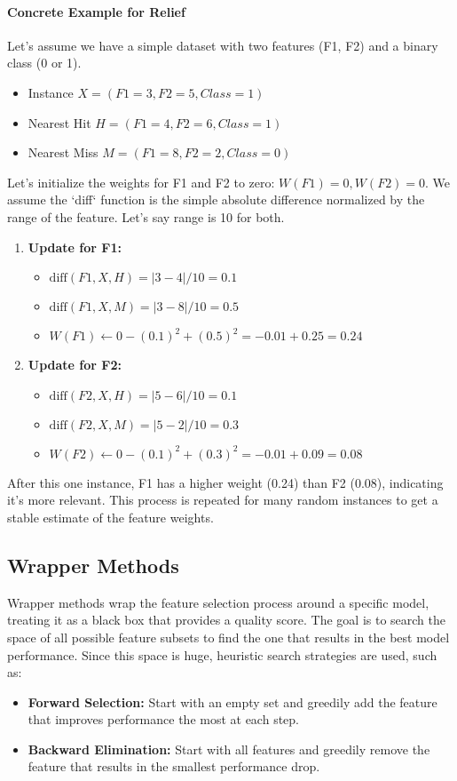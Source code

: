 \documentclass{article}
\begin{document}
\begin{multicols}{2}
	\paragraph{Concrete Example for Relief}
	Let's assume we have a simple dataset with two features (F1, F2) and a binary class (0 or 1).
	\begin{itemize}
		\item Instance $X = (F1=3, F2=5, Class=1)$
		\item Nearest Hit $H = (F1=4, F2=6, Class=1)$
		\item Nearest Miss $M = (F1=8, F2=2, Class=0)$
	\end{itemize}
	Let's initialize the weights for F1 and F2 to zero: $W(F1)=0, W(F2)=0$. We assume the `diff` function is the simple absolute difference normalized by the range of the feature. Let's say range is 10 for both.
	\begin{enumerate}
		\item \textbf{Update for F1:}
		      \begin{itemize}
			      \item $\text{diff}(F1, X, H) = |3 - 4| / 10 = 0.1$
			      \item $\text{diff}(F1, X, M) = |3 - 8| / 10 = 0.5$
			      \item $W(F1) \leftarrow 0 - (0.1)^2 + (0.5)^2 = -0.01 + 0.25 = 0.24$
		      \end{itemize}
		\item \textbf{Update for F2:}
		      \begin{itemize}
			      \item $\text{diff}(F2, X, H) = |5 - 6| / 10 = 0.1$
			      \item $\text{diff}(F2, X, M) = |5 - 2| / 10 = 0.3$
			      \item $W(F2) \leftarrow 0 - (0.1)^2 + (0.3)^2 = -0.01 + 0.09 = 0.08$
		      \end{itemize}
	\end{enumerate}
	After this one instance, F1 has a higher weight (0.24) than F2 (0.08), indicating it's more relevant. This process is repeated for many random instances to get a stable estimate of the feature weights.

	\subsection{Wrapper Methods}
	Wrapper methods wrap the feature selection process around a specific model, treating it as a black box that provides a quality score. The goal is to search the space of all possible feature subsets to find the one that results in the best model performance. Since this space is huge, heuristic search strategies are used, such as:
	\begin{itemize}
		\item \textbf{Forward Selection:} Start with an empty set and greedily add the feature that improves performance the most at each step.
		\item \textbf{Backward Elimination:} Start with all features and greedily remove the feature that results in the smallest performance drop.
	\end{itemize}


\end{multicols}
\end{document}
